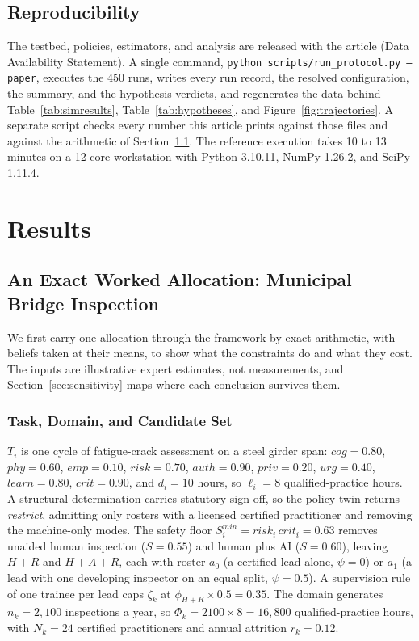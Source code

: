 \documentclass[utf8]{FrontiersinHarvard}
\begin{document}
	\subsection{Reproducibility}
	\label{sec:repro}

	The testbed, policies, estimators, and analysis are released with the article (Data Availability Statement). A single command, \texttt{python scripts/run\_protocol.py --paper}, executes the 450 runs, writes every run record, the resolved configuration, the summary, and the hypothesis verdicts, and regenerates the data behind Table~\ref{tab:simresults}, Table~\ref{tab:hypotheses}, and Figure~\ref{fig:trajectories}. A separate script checks every number this article prints against those files and against the arithmetic of Section~\ref{sec:worked}. The reference execution takes 10 to 13 minutes on a 12-core workstation with Python 3.10.11, NumPy 1.26.2, and SciPy 1.11.4.

	\section{Results}
	\label{sec:results}

	\subsection{An Exact Worked Allocation: Municipal Bridge Inspection}
	\label{sec:worked}

	We first carry one allocation through the framework by exact arithmetic, with beliefs taken at their means, to show what the constraints do and what they cost. The inputs are illustrative expert estimates, not measurements, and Section~\ref{sec:sensitivity} maps where each conclusion survives them.

	\subsubsection*{Task, Domain, and Candidate Set}
	\label{sec:workedsetup}

	$T_i$ is one cycle of fatigue-crack assessment on a steel girder span: $cog=0.80$, $phy=0.60$, $emp=0.10$, $risk=0.70$, $auth=0.90$, $priv=0.20$, $urg=0.40$, $learn=0.80$, $crit=0.90$, and $d_i=10$ hours, so $\ell_i=8$ qualified-practice hours. A structural determination carries statutory sign-off, so the policy twin returns \textit{restrict}, admitting only rosters with a licensed certified practitioner and removing the machine-only modes. The safety floor $S^{min}_i=risk_i\,crit_i=0.63$ removes unaided human inspection ($S=0.55$) and human plus AI ($S=0.60$), leaving $H{+}R$ and $H{+}A{+}R$, each with roster $a_0$ (a certified lead alone, $\psi=0$) or $a_1$ (a lead with one developing inspector on an equal split, $\psi=0.5$). A supervision rule of one trainee per lead caps $\bar\zeta_k$ at $\phi_{H+R}\times0.5=0.35$. The domain generates $n_k=2{,}100$ inspections a year, so $\Phi_k=2100\times8=16{,}800$ qualified-practice hours, with $N_k=24$ certified practitioners and annual attrition $r_k=0.12$.
\end{document}

